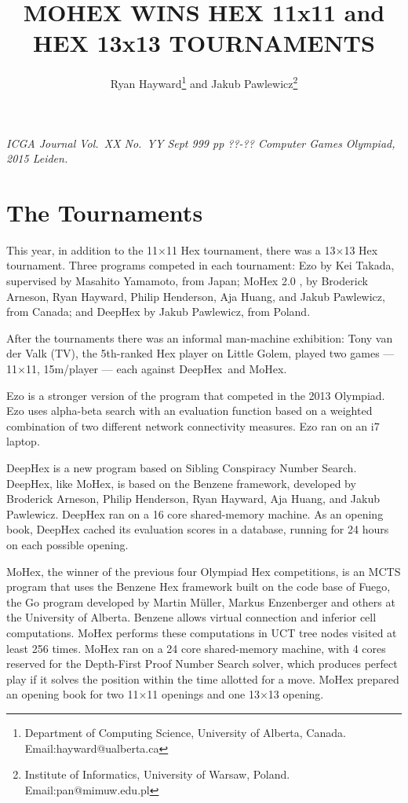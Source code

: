 \documentclass{icga}
\title{\sc MOHEX WINS HEX 11x11 and HEX 13x13 TOURNAMENTS}
\author{Ryan Hayward\thanks{Department 
of Computing Science, University of Alberta, Canada. Email:hayward@ualberta.ca} and
Jakub Pawlewicz\thanks{Institute of Informatics, University of Warsaw, Poland. Email:pan@mimuw.edu.pl}
}
\affiliation{Edmonton, Canada}
\def\Dx{\mbox{\sc DeepHex}}
\def\Eo{\mbox{\sc Ezo}}
\def\Mx{\mbox{\sc MoHex}}
\def\Fuego{\mbox{\sc Fuego}}
\def\TV{\mbox{\sc TV}} %
\begin{document}
\maketitle

\vspace*{-2.25in}
{\it ICGA Journal Vol.\ XX No.\ YY Sept 999 pp ??-??
\hfill Computer Games Olympiad, 2015 Leiden.}
\vspace*{2.0in}

\section{The Tournaments}
This year, in addition to the 11$\times$11 Hex tournament,
there was a 13$\times$13 Hex tournament.
Three programs competed in each tournament:
\Eo{} 
by Kei Takada, supervised by Masahito Yamamoto, from Japan;
\Mx{} 2.0 ,
by Broderick Arneson, Ryan Hayward, Philip Henderson, Aja Huang, and Jakub Pawlewicz,
from Canada;
and
\Dx{}
by Jakub Pawlewicz, 
from Poland.

After the tournaments there was an informal man-machine exhibition:
Tony van der Valk (\TV), the 5th-ranked Hex player on Little Golem,
played two games --- 11$\times$11, 15m/player --- each against \Dx\ and \Mx.

\Eo{} is a stronger version of the program that competed in the 2013 Olympiad.
\Eo{} uses alpha-beta search with an evaluation function based on
a weighted combination of two different network connectivity measures.
\Eo{} ran on an i7 laptop.

\Dx{} is a new program based on Sibling Conspiracy Number Search.
\Dx{}, like \Mx, is based on the Benzene framework, 
developed by Broderick Arneson, Philip Henderson, Ryan Hayward,
Aja Huang, and Jakub Pawlewicz.
\Dx{} ran on a 16 core shared-memory machine.
As an opening book, \Dx{} cached its evaluation scores in a database,
running for 24 hours on each possible opening.

\Mx{}, the winner of the previous four Olympiad Hex competitions,
is an MCTS program that uses the Benzene Hex framework
built on the code base of \Fuego, 
the Go program developed by Martin M\"{u}ller, Markus Enzenberger
and others at the University of Alberta.
Benzene allows virtual connection and
inferior cell computations.
\Mx{} performs these computations in UCT tree nodes visited at least 256 times.
\Mx{} ran on a 24 core shared-memory machine, 
with 4 cores reserved for the 
Depth-First Proof Number Search solver, which
produces perfect play if it solves the
position within the time allotted for a move.
\Mx{} prepared an opening book for two 11$\times$11 openings 
and one 13$\times$13 opening.
\end{document}
